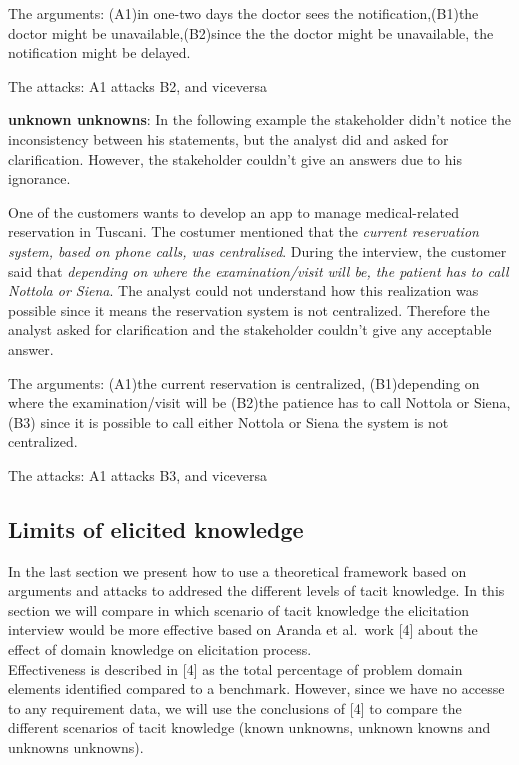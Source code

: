 \documentclass[]{llncs}
\begin{document}
The arguments: (A1)in one-two days the doctor sees the
notification,(B1)the doctor might be unavailable,(B2)since the the
doctor might be unavailable, the notification might be delayed.

The attacks: A1 attacks B2, and viceversa

\textbf{unknown unknowns}: In the following example the stakeholder
didn't notice the inconsistency between his statements, but the analyst
did and asked for clarification. However, the stakeholder couldn't give
an answers due to his ignorance.

One of the customers wants to develop an app to manage medical-related
reservation in Tuscani. The costumer mentioned that the \emph{current
reservation system, based on phone calls, was centralised}. During the
interview, the customer said that \emph{depending on where the
examination/visit will be, the patient has to call Nottola or Siena}.
The analyst could not understand how this realization was possible since
it means the reservation system is not centralized. Therefore the
analyst asked for clarification and the stakeholder couldn't give any
acceptable answer.

The arguments: (A1)the current reservation is centralized, (B1)depending
on where the examination/visit will be (B2)the patience has to call
Nottola or Siena, (B3) since it is possible to call either Nottola or
Siena the system is not centralized.

The attacks: A1 attacks B3, and viceversa

\hypertarget{limits-of-elicited-knowledge}{%
\subsection{Limits of elicited
knowledge}\label{limits-of-elicited-knowledge}}

In the last section we present how to use a theoretical framework based
on arguments and attacks to addresed the different levels of tacit
knowledge. In this section we will compare in which scenario of tacit
knowledge the elicitation interview would be more effective based on
Aranda et al.~work {[}4{]} about the effect of domain knowledge on
elicitation process.\\
Effectiveness is described in {[}4{]} as the total percentage of problem
domain elements identified compared to a benchmark. However, since we
have no accesse to any requirement data, we will use the conclusions of
{[}4{]} to compare the different scenarios of tacit knowledge (known
unknowns, unknown knowns and unknowns unknowns).
\end{document}
